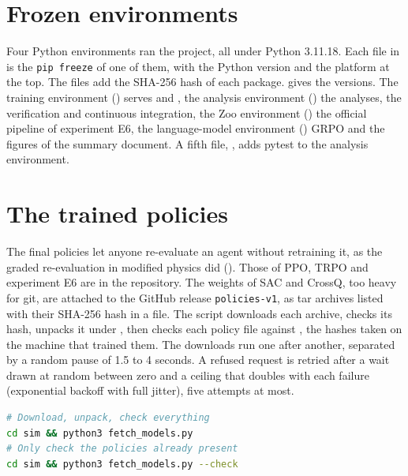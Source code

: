 \section{Frozen environments}
\label{sec:envs}

Four Python environments ran the project, all under Python 3.11.18. Each file in  is the
\texttt{pip freeze} of one of them, with the Python version and the
platform at the top. The  files add the SHA-256 hash of each package.
 gives the versions. The training environment ()
serves  and , the analysis environment () the analyses,
the verification and continuous integration, the Zoo environment () the official
pipeline of experiment E6, the language-model environment () GRPO and the figures
of the summary document. A fifth file, , adds pytest to the analysis environment.

\section{The trained policies}
\label{sec:release}

The final policies let anyone re-evaluate an agent without retraining it, as the graded
re-evaluation in modified physics did (). Those of PPO, TRPO and experiment E6 are
in the repository. The weights of SAC and CrossQ, too heavy for git, are attached to the GitHub
release \texttt{policies-v1}, as tar archives listed with their SHA-256 hash in a 
file. The script  downloads each archive, checks its hash, unpacks it
under , then checks each policy file against , the
hashes taken on the machine that trained them. The downloads run one after
another, separated by a random pause of 1.5 to 4 seconds. A refused request is retried after a
wait drawn at random between zero and a ceiling that doubles with each failure (exponential backoff
with full jitter), five attempts at most.

\begin{lstlisting}[language=bash,caption={Fetching and checking the policies of SAC and CrossQ.},captionpos=b]
# Download, unpack, check everything
cd sim && python3 fetch_models.py
# Only check the policies already present
cd sim && python3 fetch_models.py --check
\end{lstlisting}

